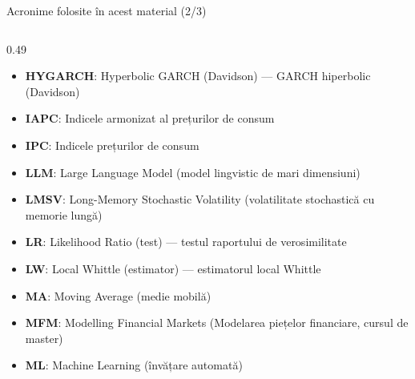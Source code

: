 \begin{frame}{Acronime folosite în acest material (2/3)}
\begin{columns}[T]
\begin{column}{0.49\textwidth}
\begin{itemize}
    \item \textbf{HYGARCH}: Hyperbolic GARCH (Davidson) — GARCH hiperbolic (Davidson)
    \item \textbf{IAPC}: Indicele armonizat al prețurilor de consum
    \item \textbf{IPC}: Indicele prețurilor de consum
    \item \textbf{LLM}: Large Language Model (model lingvistic de mari dimensiuni)
    \item \textbf{LMSV}: Long-Memory Stochastic Volatility (volatilitate stochastică cu memorie lungă)
    \item \textbf{LR}: Likelihood Ratio (test) — testul raportului de verosimilitate
    \item \textbf{LW}: Local Whittle (estimator) — estimatorul local Whittle
    \item \textbf{MA}: Moving Average (medie mobilă)
    \item \textbf{MFM}: Modelling Financial Markets (Modelarea piețelor financiare, cursul de master)
    \item \textbf{ML}: Machine Learning (învățare automată)
\end{itemize}
\end{column}
\end{columns}
\end{frame}
